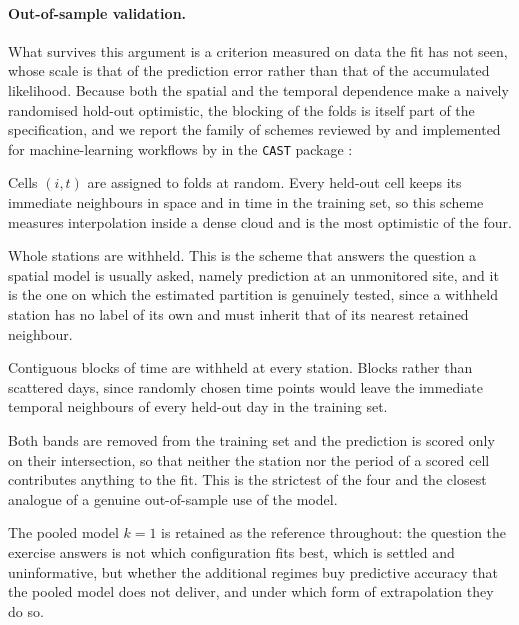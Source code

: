 \paragraph{Out-of-sample validation.} What survives this argument is a criterion measured on data the fit has not seen, whose scale is that of the prediction error rather than that of the accumulated likelihood. Because both the spatial and the temporal dependence make a naively randomised hold-out optimistic, the blocking of the folds is itself part of the specification, and we report the family of schemes reviewed by \citet{OttoFassoMaranzano2024} and implemented for machine-learning workflows by \citet{MeyerEtAl2018} in the \texttt{CAST} package \citep{CAST}:
\begin{description}[leftmargin=1.4em,itemsep=2pt,topsep=3pt]
  \item[\emph{Random $K$-fold}.] Cells $(i,t)$ are assigned to folds at random. Every held-out cell keeps its immediate neighbours in space and in time in the training set, so this scheme measures interpolation inside a dense cloud and is the most optimistic of the four.
  \item[\emph{Leave-$K$-locations-out} (LKLO).] Whole stations are withheld. This is the scheme that answers the question a spatial model is usually asked, namely prediction at an unmonitored site, and it is the one on which the estimated partition is genuinely tested, since a withheld station has no label of its own and must inherit that of its nearest retained neighbour.
  \item[\emph{Leave-$K$-times-out} (LKTO).] Contiguous blocks of time are withheld at every station. Blocks rather than scattered days, since randomly chosen time points would leave the immediate temporal neighbours of every held-out day in the training set.
  \item[\emph{Leave-$K$-locations-and-$H$-times-out} (LKLHTO).] Both bands are removed from the training set and the prediction is scored only on their intersection, so that neither the station nor the period of a scored cell contributes anything to the fit. This is the strictest of the four and the closest analogue of a genuine out-of-sample use of the model.
\end{description}
The pooled model $k = 1$ is retained as the reference throughout: the question the exercise answers is not which configuration fits best, which is settled and uninformative, but whether the additional regimes buy predictive accuracy that the pooled model does not deliver, and under which form of extrapolation they do so.


